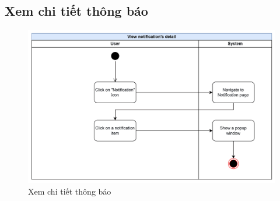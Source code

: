 \subsection{Xem chi tiết thông báo}
    \begin{figure}[H]
        \centering
        \includegraphics[width=\linewidth]{Content/Phân tích và thiết kế hệ thống/documents/Sơ đồ hoạt động/images/viewNotificationDetail.png}
        \vspace{0.5cm}
        \caption{Xem chi tiết thông báo}
        \label{fig:Xem chi tiết thông báo}
    \end{figure}